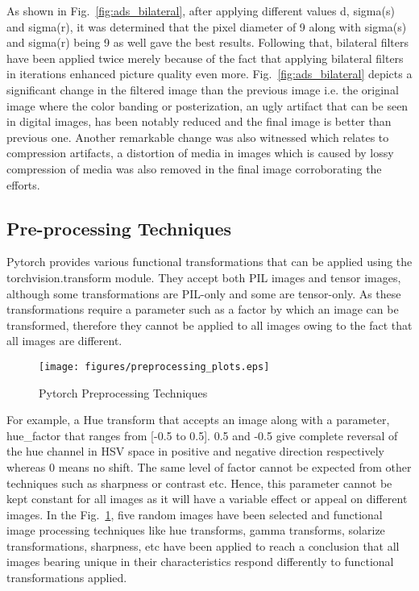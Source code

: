\documentclass[conference]{IEEEtran}
\begin{document}
As shown in Fig.~\ref{fig:ads_bilateral}, after applying different values d, sigma(s) and sigma(r), it was determined that the pixel diameter of 9 along with sigma(s) and sigma(r) being 9 as well gave the best results. Following that, bilateral filters have been applied twice merely because of the fact that applying bilateral filters in iterations enhanced picture quality even more. Fig.~\ref{fig:ads_bilateral} depicts a significant change in the filtered image than the previous image i.e. the original image where the color banding or posterization, an ugly artifact that can be seen in digital images, has been notably reduced\cite{b16} and the final image is better than previous one. Another remarkable change was also witnessed which relates to compression artifacts, a distortion of media in images which is caused by lossy compression of media was also removed in the final image corroborating the efforts. 

\subsection{Pre-processing Techniques}
Pytorch provides various functional transformations that can be applied using the torchvision.transform module. They accept both PIL images and tensor images, although some transformations are PIL-only and some are tensor-only\cite{b17}. As these transformations require a parameter such as a factor by which an image can be transformed, therefore they cannot be applied to all images owing to the fact that all images are different.

\begin{figure}[htbp]
    \texttt{[image: figures/preprocessing\_plots.eps]}
    \caption{Pytorch Preprocessing Techniques}
    \label{fig:preprocessing_plots}
    \end{figure}

For example, a Hue transform that accepts an image along with a parameter, hue\_factor that ranges from [-0.5 to 0.5]. 0.5 and -0.5 give complete reversal of the hue channel in HSV space in positive and negative direction respectively whereas 0 means no shift. The same level of factor cannot be expected from other techniques such as sharpness or contrast etc. Hence, this parameter cannot be kept constant for all images as it will have a variable effect or appeal on different images. In the Fig.~\ref{fig:preprocessing_plots}, five random images have been selected and functional image processing techniques like hue transforms, gamma transforms, solarize transformations, sharpness, etc have been applied to reach a conclusion that all images bearing unique in their characteristics respond differently to functional transformations applied.
\end{document}
